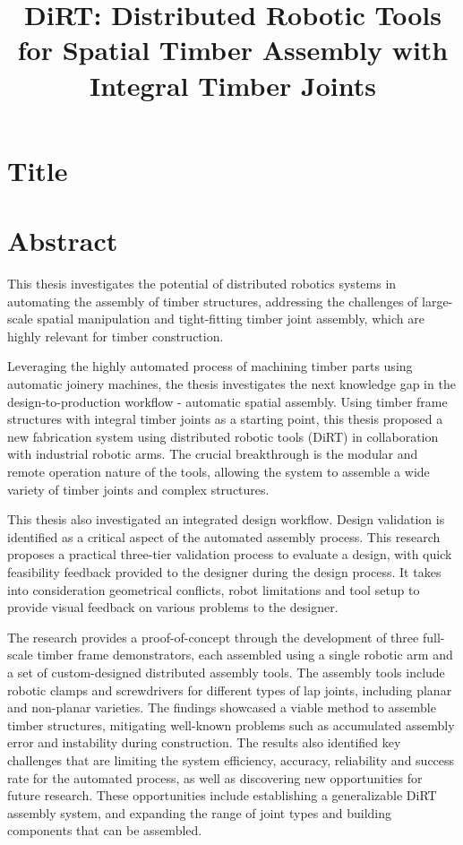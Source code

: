 \documentclass[11pt]{book}
\title{DiRT: Distributed Robotic Tools for Spatial Timber Assembly with Integral Timber Joints}
\begin{document}
\maketitle

\chapter{Title}

\chapter{Abstract}

This thesis investigates the potential of distributed robotics systems in automating the assembly of timber structures, addressing the challenges of large-scale spatial manipulation and tight-fitting timber joint assembly, which are highly relevant for timber construction.

Leveraging the highly automated process of machining timber parts using automatic joinery machines, the thesis investigates the next knowledge gap in the design-to-production workflow - automatic spatial assembly. Using timber frame structures with integral timber joints as a starting point, this thesis proposed a new fabrication system using distributed robotic tools (DiRT) in collaboration with industrial robotic arms. The crucial breakthrough is the modular and remote operation nature of the tools, allowing the system to assemble a wide variety of timber joints and complex structures.

This thesis also investigated an integrated design workflow. Design validation is identified as a critical aspect of the automated assembly process. This research proposes a practical three-tier validation process to evaluate a design, with quick feasibility feedback provided to the designer during the design process. It takes into consideration geometrical conflicts, robot limitations and tool setup to provide visual feedback on various problems to the designer. 

The research provides a proof-of-concept through the development of three full-scale timber frame demonstrators, each assembled using a single robotic arm and a set of custom-designed distributed assembly tools. The assembly tools include robotic clamps and screwdrivers for different types of lap joints, including planar and non-planar varieties. The findings showcased a viable method to assemble timber structures, mitigating well-known problems such as accumulated assembly error and instability during construction. The results also identified key challenges that are limiting the system efficiency, accuracy, reliability and success rate for the automated process, as well as discovering new opportunities for future research. These opportunities include establishing a generalizable DiRT assembly system, and expanding the range of joint types and building components that can be assembled.
\end{document}
